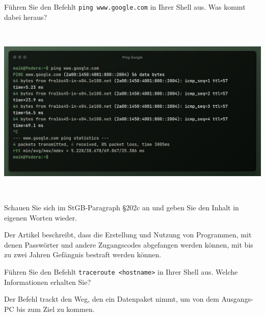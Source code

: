 \documentclass[11pt]{article}
\begin{document}
\begin{aufgabe}
  Führen Sie den Befehlt \texttt{ping www.google.com} in Ihrer Shell aus. Was kommt dabei heraus?

  \centering
  \includegraphics[height=8.5cm]{google-ping.png}
\end{aufgabe}

\begin{aufgabe}
  Schauen Sie sich im StGB-Paragraph §202c an und geben Sie den Inhalt in eigenen Worten wieder.

  Der Artikel beschreibt, dass die Erstellung und Nutzung von Programmen, mit denen Passwörter und andere Zugangscodes
  abgefangen werden können, mit bis zu zwei Jahren Gefängnis bestraft werden können.
\end{aufgabe}

\begin{aufgabe}
  Führen Sie den Befehlt \texttt{traceroute <hostname>} in Ihrer Shell aus. Welche Informationen erhalten Sie?

  Der Befehl trackt den Weg, den ein Datenpaket nimmt, um von dem Ausgangs-PC bis zum Ziel zu kommen.
\end{aufgabe}
\end{document}
